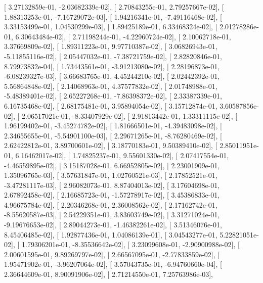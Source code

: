 \documentclass{article}
\begin{document}
       [  3.27132859e-01,  -2.03682339e-02],
       [  2.70843255e-01,   2.79257667e-02],
       [  1.88313253e-01,  -7.16729072e-03],
       [  1.94216341e-01,  -7.49116468e-02],
       [  3.33153499e-01,   1.04530299e-03],
       [  1.89425189e-01,   6.33468324e-02],
       [  2.01278286e-01,   6.30643484e-02],
       [  2.71198244e-01,  -4.22960724e-02],
       [  2.10062718e-01,   3.37669809e-02],
       [  1.89311223e-01,   9.97710387e-02],
       [  3.06826943e-01,  -5.11855116e-02],
       [  2.05447032e-01,  -7.38721759e-02],
       [  2.82820846e-01,   8.79973832e-04],
       [  1.73443561e-01,  -3.91213080e-02],
       [  2.28196873e-01,  -6.08239327e-03],
       [  3.66683765e-01,   4.45244210e-02],
       [  2.02442392e-01,   5.56864848e-02],
       [  2.14068963e-01,   4.37577832e-02],
       [  2.01748988e-01,  -5.48389401e-02],
       [  2.65227268e-01,  -7.86398372e-02],
       [  2.33387339e-01,   6.16735468e-02],
       [  2.68175481e-01,   3.95894054e-02],
       [  3.15712874e-01,   3.60587856e-02],
       [  2.06517021e-01,  -8.33407929e-02],
       [  2.91813442e-01,   1.33311115e-02],
       [  1.96199402e-01,  -3.45274782e-02],
       [  1.81666501e-01,  -4.39483098e-02],
       [  2.34655655e-01,  -5.54901100e-03],
       [  2.29671265e-01,  -8.76280469e-02],
       [  2.62422812e-01,   3.89700601e-02],
       [  3.18770183e-01,   9.50389410e-02],
       [  2.85011951e-01,   6.16462017e-02],
       [  1.74825237e-01,   9.55601330e-02],
       [  2.07417554e-01,  -4.46559895e-02],
       [  3.15187028e-01,   6.66952805e-02],
       [  2.23001909e-01,   1.35096765e-03],
       [  3.57631847e-01,   1.02760521e-03],
       [  2.17852521e-01,  -3.47281117e-03],
       [  2.96082073e-01,   8.87404013e-02],
       [  3.17604698e-01,   2.67892458e-02],
       [  2.16685723e-01,  -1.57278917e-02],
       [  3.45386833e-01,   4.96675784e-02],
       [  2.20346268e-01,   2.36008562e-02],
       [  2.17162742e-01,  -8.55620587e-03],
       [  2.54229351e-01,   3.83603749e-02],
       [  3.31271024e-01,  -9.19676653e-02],
       [  2.89044273e-01,  -1.46382261e-02],
       [  3.51346076e-01,   8.45406485e-02],
       [  1.92877436e-01,   1.04086139e-01],
       [  3.04543277e-01,   5.22821051e-02],
       [  1.79306201e-01,  -8.35536642e-02],
       [  3.23099608e-01,  -2.90900988e-02],
       [  2.00601595e-01,   9.89269797e-02],
       [  2.66567095e-01,  -2.77833859e-02],
       [  1.95471902e-01,  -3.96207064e-02],
       [  3.57043735e-01,  -6.94760660e-04],
       [  2.36644609e-01,   8.90091906e-02],
       [  2.71214550e-01,   7.25763986e-03],
\end{document}
